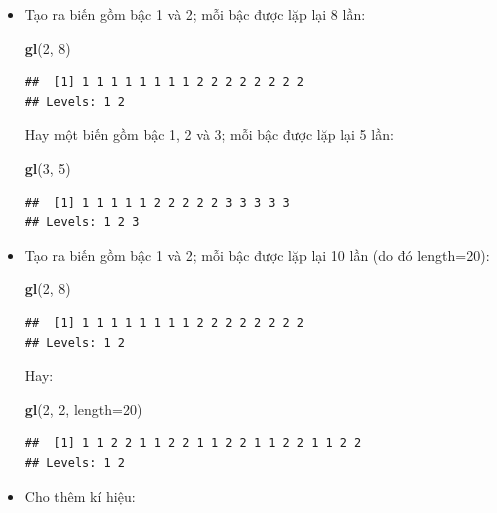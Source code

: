 \documentclass[
]{book}
\newenvironment{Shaded}{\begin{snugshade}}{\end{snugshade}}
\newcommand{\DataTypeTok}[1]{\textcolor[rgb]{0.13,0.29,0.53}{#1}}
\newcommand{\DecValTok}[1]{\textcolor[rgb]{0.00,0.00,0.81}{#1}}
\newcommand{\KeywordTok}[1]{\textcolor[rgb]{0.13,0.29,0.53}{\textbf{#1}}}
\newcommand{\NormalTok}[1]{#1}
\begin{document}
\begin{itemize}
\item
  Tạo ra biến gồm bậc 1 và 2; mỗi bậc được lặp lại 8 lần:

\begin{Shaded}
\begin{Highlighting}[]
\KeywordTok{gl}\NormalTok{(}\DecValTok{2}\NormalTok{, }\DecValTok{8}\NormalTok{)}
\end{Highlighting}
\end{Shaded}

\begin{verbatim}
##  [1] 1 1 1 1 1 1 1 1 2 2 2 2 2 2 2 2
## Levels: 1 2
\end{verbatim}

  Hay một biến gồm bậc 1, 2 và 3; mỗi bậc được lặp lại 5 lần:

\begin{Shaded}
\begin{Highlighting}[]
\KeywordTok{gl}\NormalTok{(}\DecValTok{3}\NormalTok{, }\DecValTok{5}\NormalTok{)}
\end{Highlighting}
\end{Shaded}

\begin{verbatim}
##  [1] 1 1 1 1 1 2 2 2 2 2 3 3 3 3 3
## Levels: 1 2 3
\end{verbatim}
\item
  Tạo ra biến gồm bậc 1 và 2; mỗi bậc được lặp lại 10 lần (do đó length=20):

\begin{Shaded}
\begin{Highlighting}[]
\KeywordTok{gl}\NormalTok{(}\DecValTok{2}\NormalTok{, }\DecValTok{8}\NormalTok{)}
\end{Highlighting}
\end{Shaded}

\begin{verbatim}
##  [1] 1 1 1 1 1 1 1 1 2 2 2 2 2 2 2 2
## Levels: 1 2
\end{verbatim}

  Hay:

\begin{Shaded}
\begin{Highlighting}[]
\KeywordTok{gl}\NormalTok{(}\DecValTok{2}\NormalTok{, }\DecValTok{2}\NormalTok{, }\DataTypeTok{length=}\DecValTok{20}\NormalTok{)}
\end{Highlighting}
\end{Shaded}

\begin{verbatim}
##  [1] 1 1 2 2 1 1 2 2 1 1 2 2 1 1 2 2 1 1 2 2
## Levels: 1 2
\end{verbatim}
\item
  Cho thêm kí hiệu:


\end{itemize}
\end{document}
